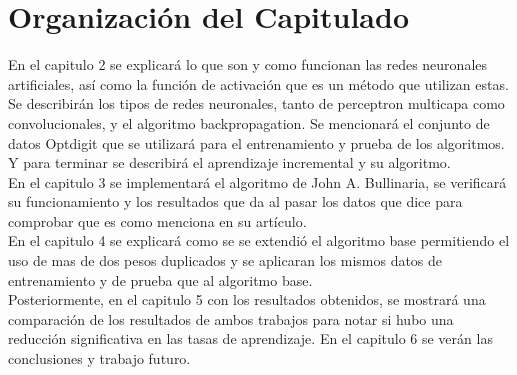 
\section{Organización del Capitulado}


		En el capitulo 2 se explicará lo que son y como funcionan las redes neuronales artificiales, así como la función de activación que es un método que utilizan estas.
		Se describirán los tipos de redes neuronales, tanto de perceptron multicapa como convolucionales, y el algoritmo backpropagation.
		Se mencionará el conjunto de datos Optdigit que se utilizará para el entrenamiento y prueba de los algoritmos.
		Y para terminar se describirá el aprendizaje incremental y su algoritmo.\\
		
		En el capitulo 3 se implementará el algoritmo de John A. Bullinaria, se verificará su funcionamiento y los resultados que da al pasar los datos que dice para comprobar que es como menciona en su artículo.\\
		En el capitulo 4 se explicará como se se extendió el algoritmo base permitiendo el uso de mas de dos pesos duplicados y se aplicaran los mismos datos de entrenamiento y de prueba que al algoritmo base.\\
		
		Posteriormente, en el capitulo 5 con los resultados obtenidos, se mostrará una comparación de los resultados de ambos trabajos para notar si hubo una reducción significativa en las tasas de aprendizaje. En el capitulo 6 se verán las conclusiones y trabajo futuro.